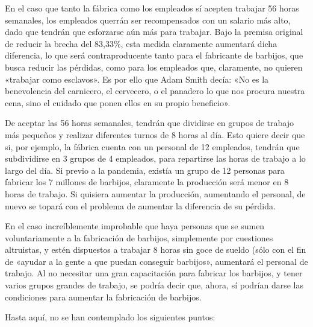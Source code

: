 \documentclass[12pt,a4paper,twoside]{book}
\begin{document}
En el caso que tanto la fábrica como los empleados sí acepten trabajar 56 horas semanales, los empleados querrán ser recompensados con un salario más alto, dado que tendrán que esforzarse aún más para trabajar. Bajo la premisa original de reducir la brecha del 83,33\%, esta medida claramente aumentará dicha diferencia, lo que será contraproducente tanto para el fabricante de barbijos, que busca reducir las pérdidas, como para los empleados que, claramente, no quieren «trabajar como esclavos». Es por ello que Adam Smith decía: «No es la benevolencia del carnicero, el cervecero, o el panadero lo que nos procura nuestra cena, sino el cuidado que ponen ellos en su propio beneficio». \cite{smith:riqueza-naciones}

De aceptar las 56 horas semanales, tendrán que dividirse en grupos de trabajo más pequeños y realizar diferentes turnos de 8 horas al día. Esto quiere decir que si, por ejemplo, la fábrica cuenta con un personal de 12 empleados, tendrán que subdividirse en 3 grupos de 4 empleados, para repartirse las horas de trabajo a lo largo del día. Si previo a la pandemia, existía un grupo de 12 personas para fabricar los 7 millones de barbijos, claramente la producción será menor en 8 horas de trabajo. Si quisiera aumentar la producción, aumentando el personal, de nuevo se topará con el problema de aumentar la diferencia de su pérdida.

En el caso increíblemente improbable que haya personas que se sumen voluntariamente a la fabricación de barbijos, simplemente por cuestiones altruistas, y estén dispuestos a trabajar 8 horas sin goce de sueldo (sólo con el fin de «ayudar a la gente a que puedan conseguir barbijos», aumentará el personal de trabajo. Al no necesitar una gran capacitación para fabricar los barbijos, y tener varios grupos grandes de trabajo, se podría decir que, ahora, sí podrían darse las condiciones para aumentar la fabricación de barbijos.

Hasta aquí, no se han contemplado los siguientes puntos:
\end{document}
